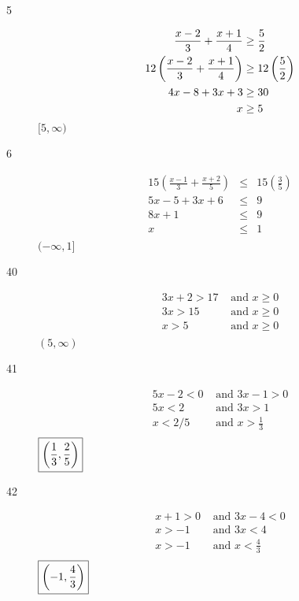 \documentclass[letterpaper, landscape]{exam}
\begin{document}
      \begin{description}
        \item[5]
          \begin{align*}
            \frac{x-2}{3} + \frac{x+1}{4}          & \geq \frac{5}{2} \\
            12 \del{\frac{x-2}{3} + \frac{x+1}{4}} & \geq 12 \del{\frac{5}{2}} \\
            4x - 8 + 3x + 3                        & \geq 30 \\
            x                                      & \geq 5 \\
          \end{align*}
          $\boxed{ [5, \infty) }$

        \item[6]
          \begin{align*}
            15(\frac{x-1}{3} + \frac{x+2}{5}) & \leq & 15(\frac{3}{5}) \\
            5x - 5 + 3x + 6                   & \leq & 9 \\
            8x + 1                            & \leq & 9 \\
            x                                 & \leq & 1 \\
          \end{align*}
          $\boxed{ (-\infty, 1] }$

        \item[40]
          \begin{align*}
            3x + 2 > 17 & \text{ and } x \geq 0 \\
            3x > 15     & \text{ and } x \geq 0 \\
            x > 5       & \text{ and } x \geq 0 \\
          \end{align*}
          $\boxed{ (5, \infty) }$

        \item[41]
          \begin{align*}
            5x - 2 < 0 & \text{ and } 3x - 1 > 0 \\
            5x < 2     & \text{ and } 3x > 1 \\
            x < 2/5    & \text{ and } x > \frac{1}{3} \\
          \end{align*}
          $\boxed{ \del{ \frac{1}{3}, \frac{2}{5} } }$

        \item[42]
          \begin{align*}
            x + 1 > 0 & \text{ and } 3x - 4 < 0 \\
            x > -1    & \text{ and } 3x < 4 \\
            x > -1    & \text{ and } x < \frac{4}{3} \\
          \end{align*}
          $\boxed{ \del{ -1, \frac{4}{3} } }$


\end{description}
\end{document}
